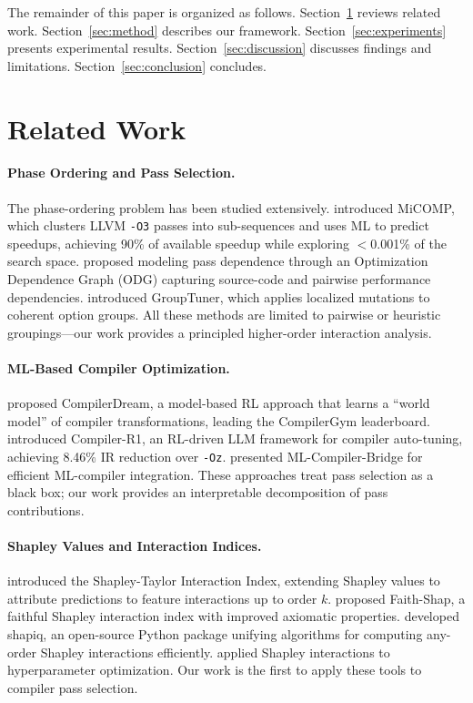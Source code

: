 \documentclass[preprint]{article}
\begin{document}
The remainder of this paper is organized as follows. Section~\ref{sec:related} reviews related work. Section~\ref{sec:method} describes our framework. Section~\ref{sec:experiments} presents experimental results. Section~\ref{sec:discussion} discusses findings and limitations. Section~\ref{sec:conclusion} concludes.

\section{Related Work}
\label{sec:related}

\paragraph{Phase Ordering and Pass Selection.}
The phase-ordering problem has been studied extensively. \citet{ashouri2017micomp} introduced MiCOMP, which clusters LLVM \texttt{-O3} passes into sub-sequences and uses ML to predict speedups, achieving 90\% of available speedup while exploring $<$0.001\% of the search space. \citet{gao2024odg} proposed modeling pass dependence through an Optimization Dependence Graph (ODG) capturing source-code and pairwise performance dependencies. \citet{gao2025grouptuner} introduced GroupTuner, which applies localized mutations to coherent option groups. All these methods are limited to pairwise or heuristic groupings---our work provides a principled higher-order interaction analysis.

\paragraph{ML-Based Compiler Optimization.}
\citet{deng2025compilerdream} proposed CompilerDream, a model-based RL approach that learns a ``world model'' of compiler transformations, leading the CompilerGym leaderboard. \citet{pan2025compilerr1} introduced Compiler-R1, an RL-driven LLM framework for compiler auto-tuning, achieving 8.46\% IR reduction over \texttt{-Oz}. \citet{venkatakeerthy2024mlbridge} presented ML-Compiler-Bridge for efficient ML-compiler integration. These approaches treat pass selection as a black box; our work provides an interpretable decomposition of pass contributions.

\paragraph{Shapley Values and Interaction Indices.}
\citet{sundararajan2020shapley} introduced the Shapley-Taylor Interaction Index, extending Shapley values to attribute predictions to feature interactions up to order $k$. \citet{tsai2023faithshap} proposed Faith-Shap, a faithful Shapley interaction index with improved axiomatic properties. \citet{muschalik2024shapiq} developed shapiq, an open-source Python package unifying algorithms for computing any-order Shapley interactions efficiently. \citet{wever2026hypershap} applied Shapley interactions to hyperparameter optimization. Our work is the first to apply these tools to compiler pass selection.
\end{document}
